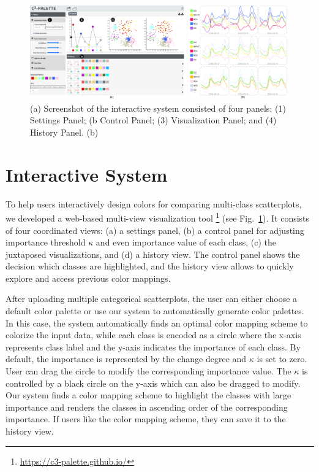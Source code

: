
\begin{figure}[ht]
\centering
\includegraphics[width=0.8\columnwidth]{figures/interface-linechart.pdf}
\caption{(a) Screenshot of the interactive system consisted of four panels: (1) Settings Panel; (b Control Panel; (3) Visualization Panel; and (4) History Panel. (b)}
\vspace*{-3mm}
\label{fig:ui}
\end{figure}

\section{Interactive System}
\label{sec:interaction}
To help users interactively design colors for comparing multi-class scatterplots, we developed a web-based multi-view visualization tool \footnote{\small \url{https://c3-palette.github.io/}} (see Fig.~\ref{fig:ui}).
It consists of four coordinated views: (a) a settings panel, (b) a control panel for adjusting importance threshold $\kappa$ and even importance value of each class, (c) the juxtaposed visualizations, and (d) a history view. The control panel shows the decision which classes are highlighted, and the history view allows to quickly explore and access previous color mappings.

After uploading multiple categorical scatterplots, the user can either choose a default color palette or use our system to automatically generate color palettes. In this case, the system automatically finds an optimal color mapping scheme to colorize the input data, while each class is encoded as a circle where the x-axis represents class label and the y-axis indicates the importance of each class. By default, the importance is represented by the change degree and $\kappa$ is set to zero. User can drag the circle to modify the corresponding importance value. The $\kappa$ is controlled by a black circle on the y-axis which can also be dragged to modify. Our system finds a color mapping scheme to highlight the classes with large importance and renders the classes in ascending order of the corresponding importance. If users like the color mapping scheme, they can save it to the history view.

